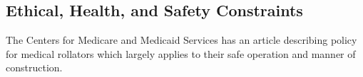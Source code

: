 \subsection{Ethical, Health, and Safety Constraints}
\noindent The Centers for Medicare and Medicaid Services has an article describing policy for medical rollators which largely applies to their safe operation and manner of construction.